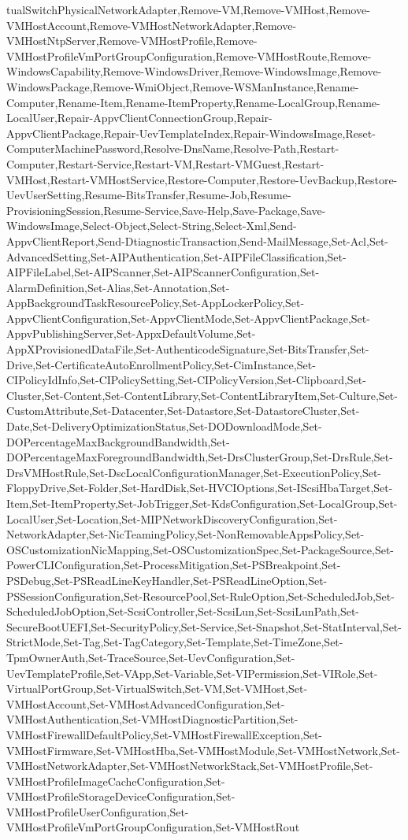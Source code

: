 {{tualSwitchPhysicalNetworkAdapter,Remove-VM,Remove-VMHost,Remove-VMHostAccount,Remove-VMHostNetworkAdapter,Remove-VMHostNtpServer,Remove-VMHostProfile,Remove-VMHostProfileVmPortGroupConfiguration,Remove-VMHostRoute,Remove-WindowsCapability,Remove-WindowsDriver,Remove-WindowsImage,Remove-WindowsPackage,Remove-WmiObject,Remove-WSManInstance,Rename-Computer,Rename-Item,Rename-ItemProperty,Rename-LocalGroup,Rename-LocalUser,Repair-AppvClientConnectionGroup,Repair-AppvClientPackage,Repair-UevTemplateIndex,Repair-WindowsImage,Reset-ComputerMachinePassword,Resolve-DnsName,Resolve-Path,Restart-Computer,Restart-Service,Restart-VM,Restart-VMGuest,Restart-VMHost,Restart-VMHostService,Restore-Computer,Restore-UevBackup,Restore-UevUserSetting,Resume-BitsTransfer,Resume-Job,Resume-ProvisioningSession,Resume-Service,Save-Help,Save-Package,Save-WindowsImage,Select-Object,Select-String,Select-Xml,Send-AppvClientReport,Send-DtiagnosticTransaction,Send-MailMessage,Set-Acl,Set-AdvancedSetting,Set-AIPAuthentication,Set-AIPFileClassification,Set-AIPFileLabel,Set-AIPScanner,Set-AIPScannerConfiguration,Set-AlarmDefinition,Set-Alias,Set-Annotation,Set-AppBackgroundTaskResourcePolicy,Set-AppLockerPolicy,Set-AppvClientConfiguration,Set-AppvClientMode,Set-AppvClientPackage,Set-AppvPublishingServer,Set-AppxDefaultVolume,Set-AppXProvisionedDataFile,Set-AuthenticodeSignature,Set-BitsTransfer,Set-Drive,Set-CertificateAutoEnrollmentPolicy,Set-CimInstance,Set-CIPolicyIdInfo,Set-CIPolicySetting,Set-CIPolicyVersion,Set-Clipboard,Set-Cluster,Set-Content,Set-ContentLibrary,Set-ContentLibraryItem,Set-Culture,Set-CustomAttribute,Set-Datacenter,Set-Datastore,Set-DatastoreCluster,Set-Date,Set-DeliveryOptimizationStatus,Set-DODownloadMode,Set-DOPercentageMaxBackgroundBandwidth,Set-DOPercentageMaxForegroundBandwidth,Set-DrsClusterGroup,Set-DrsRule,Set-DrsVMHostRule,Set-DscLocalConfigurationManager,Set-ExecutionPolicy,Set-FloppyDrive,Set-Folder,Set-HardDisk,Set-HVCIOptions,Set-IScsiHbaTarget,Set-Item,Set-ItemProperty,Set-JobTrigger,Set-KdsConfiguration,Set-LocalGroup,Set-LocalUser,Set-Location,Set-MIPNetworkDiscoveryConfiguration,Set-NetworkAdapter,Set-NicTeamingPolicy,Set-NonRemovableAppsPolicy,Set-OSCustomizationNicMapping,Set-OSCustomizationSpec,Set-PackageSource,Set-PowerCLIConfiguration,Set-ProcessMitigation,Set-PSBreakpoint,Set-PSDebug,Set-PSReadLineKeyHandler,Set-PSReadLineOption,Set-PSSessionConfiguration,Set-ResourcePool,Set-RuleOption,Set-ScheduledJob,Set-ScheduledJobOption,Set-ScsiController,Set-ScsiLun,Set-ScsiLunPath,Set-SecureBootUEFI,Set-SecurityPolicy,Set-Service,Set-Snapshot,Set-StatInterval,Set-StrictMode,Set-Tag,Set-TagCategory,Set-Template,Set-TimeZone,Set-TpmOwnerAuth,Set-TraceSource,Set-UevConfiguration,Set-UevTemplateProfile,Set-VApp,Set-Variable,Set-VIPermission,Set-VIRole,Set-VirtualPortGroup,Set-VirtualSwitch,Set-VM,Set-VMHost,Set-VMHostAccount,Set-VMHostAdvancedConfiguration,Set-VMHostAuthentication,Set-VMHostDiagnosticPartition,Set-VMHostFirewallDefaultPolicy,Set-VMHostFirewallException,Set-VMHostFirmware,Set-VMHostHba,Set-VMHostModule,Set-VMHostNetwork,Set-VMHostNetworkAdapter,Set-VMHostNetworkStack,Set-VMHostProfile,Set-VMHostProfileImageCacheConfiguration,Set-VMHostProfileStorageDeviceConfiguration,Set-VMHostProfileUserConfiguration,Set-VMHostProfileVmPortGroupConfiguration,Set-VMHostRout}}
